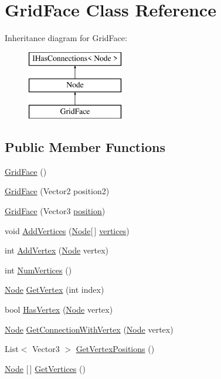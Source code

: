 \hypertarget{class_grid_face}{}\section{Grid\+Face Class Reference}
\label{class_grid_face}
Inheritance diagram for Grid\+Face\+:\begin{figure}[H]
\begin{center}
\leavevmode
\includegraphics[height=3.000000cm]{class_grid_face}
\end{center}
\end{figure}
\subsection*{Public Member Functions}
\begin{DoxyCompactItemize}
\item 
\mbox{\hyperlink{class_grid_face_a328917a6e83b3357fbb95aae6c43b861}{Grid\+Face}} ()
\item 
\mbox{\hyperlink{class_grid_face_a2f31cf59941dd0886b1a9a3bd3eec590}{Grid\+Face}} (Vector2 position2)
\item 
\mbox{\hyperlink{class_grid_face_adb30d4c2fb9f5be07319720fb21481ba}{Grid\+Face}} (Vector3 \mbox{\hyperlink{class_node_a315059cd3874b8ca61426a4e1bd097a7}{position}})
\item 
void \mbox{\hyperlink{class_grid_face_a55db6fc7a977c60fd6ce94de473d895c}{Add\+Vertices}} (\mbox{\hyperlink{class_node}{Node}}\mbox{[}$\,$\mbox{]} \mbox{\hyperlink{class_grid_face_ad283473ab08b56840f9ae843e60c1d15}{vertices}})
\item 
int \mbox{\hyperlink{class_grid_face_af0f04e74e12e9ee8f03a6675ee5a4eab}{Add\+Vertex}} (\mbox{\hyperlink{class_node}{Node}} vertex)
\item 
int \mbox{\hyperlink{class_grid_face_a31c9530fd0dca84658fde5ddfc369fc5}{Num\+Vertices}} ()
\item 
\mbox{\hyperlink{class_node}{Node}} \mbox{\hyperlink{class_grid_face_a153928011211a1740054bf60adf67730}{Get\+Vertex}} (int index)
\item 
bool \mbox{\hyperlink{class_grid_face_ad038c4fab1850cb71cdb8b4a0c2f52f2}{Has\+Vertex}} (\mbox{\hyperlink{class_node}{Node}} vertex)
\item 
\mbox{\hyperlink{class_node}{Node}} \mbox{\hyperlink{class_grid_face_a19159b9927ce52f293e566975fcd3340}{Get\+Connection\+With\+Vertex}} (\mbox{\hyperlink{class_node}{Node}} vertex)
\item 
List$<$ Vector3 $>$ \mbox{\hyperlink{class_grid_face_af4dabd4122b97fca940b763ca0000100}{Get\+Vertex\+Positions}} ()
\item 
\mbox{\hyperlink{class_node}{Node}} \mbox{[}$\,$\mbox{]} \mbox{\hyperlink{class_grid_face_a60aa8f74afb2447bf1921385581c8972}{Get\+Vertices}} ()
\end{DoxyCompactItemize}
